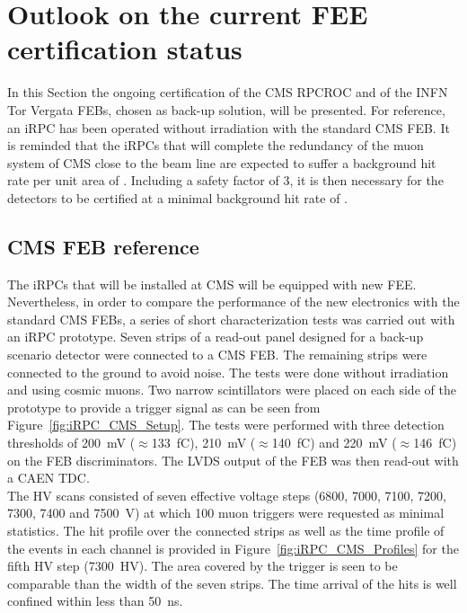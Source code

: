 	\section{Outlook on the current FEE certification status}
	\label{chapt6:sec:outlooks}
	
	In this Section the ongoing certification of the CMS RPCROC and of the INFN Tor Vergata FEBs, chosen as back-up solution, will be presented. For reference, an iRPC has been operated without irradiation with the standard CMS FEB. It is reminded that the iRPCs that will complete the redundancy of the muon system of CMS close to the beam line are expected to suffer a background hit rate per unit area of . Including a safety factor of 3, it is then necessary for the detectors to be certified at a minimal background hit rate of .
	
		\subsection{CMS \acl{FEB} reference}
		\label{chapt6:ssec:CMSFEBref}
    
    The iRPCs that will be installed at CMS will be equipped with new \acl{FEE}. Nevertheless, in order to compare the performance of the new electronics with the standard CMS FEBs, a series of short characterization tests was carried out with an iRPC prototype. Seven strips of a read-out panel designed for a back-up scenario detector were connected to a CMS FEB. The remaining strips were connected to the ground to avoid noise. The tests were done without irradiation and using cosmic muons. Two narrow scintillators were placed on each side of the prototype to provide a trigger signal as can be seen from Figure~\ref{fig:iRPC_CMS_Setup}. The tests were performed with three detection thresholds of \SI{200}{mV} ($\approx$\SI{133}{fC}), \SI{210}{mV} ($\approx$\SI{140}{fC}) and \SI{220}{mV} ($\approx$\SI{146}{fC}) on the FEB discriminators. The LVDS output of the FEB was then read-out with a CAEN TDC.\\
    The HV scans consisted of seven effective voltage steps (6800, 7000, 7100, 7200, 7300, 7400 and \SI{7500}{V}) at which 100 muon triggers were requested as minimal statistics. The hit profile over the connected strips as well as the time profile of the events in each channel is provided in Figure~\ref{fig:iRPC_CMS_Profiles} for the fifth HV step (\SI{7300}{HV}). The area covered by the trigger is seen to be comparable than the width of the seven strips. The time arrival of the hits is well confined within less than \SI{50}{ns}.
		
